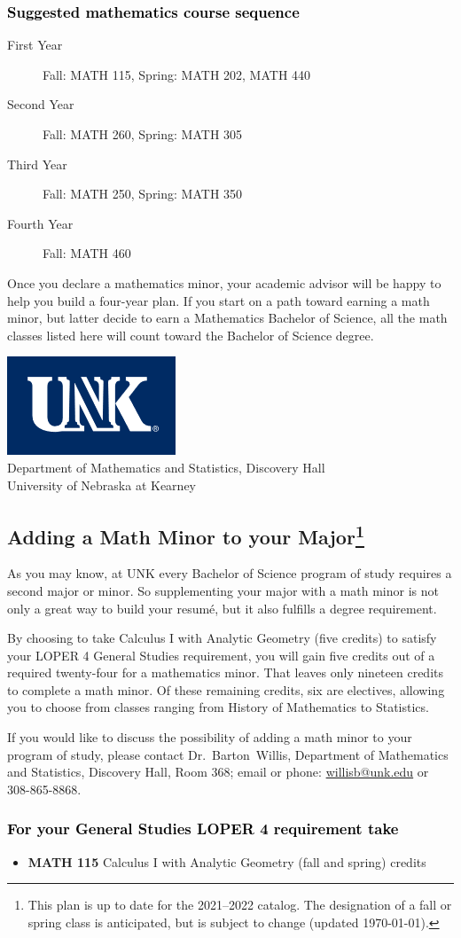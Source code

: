 \documentclass[10pt]{article}
\makeatletter
\newcommand{\calcone}{\textbf{MATH 115} Calculus I with Analytic Geometry (fall and spring) \dotfill 5 credits}
\newcommand{\contactbw}{\mbox{Dr.\ Barton Willis}, Department of Mathematics and Statistics,  Discovery Hall, Room 368;
email or phone: \href{mailto:willisb@unk.edu}{willisb@unk.edu} or 308-865-8868.}
\newcommand{\forinfo}[2]{If you would like to discuss the possibility of adding a math {#1} to your {#2}, please contact \contactbw}
\newcommand{\catalog}{2021--2022 }
\newcommand{\myfootnote}{\footnote{This plan is up to date for  the \catalog catalog. The designation of a fall or spring class is 
anticipated, but  is subject to change (updated  \today).}}
\newcommand{\myheading}{
\begin{flushleft}
\includegraphics[scale=0.35]{unk-logo}\\
\setcounter{footnote}{0}
\vspace{0.25in}
 \textcolor{unkblue}{Department of Mathematics and Statistics, Discovery Hall} \\
  \textcolor{unkblue}{University of Nebraska at Kearney}
\end{flushleft}}
\makeatother
\begin{document}
\subsubsection*{\textcolor{black}{Suggested mathematics course sequence}}

\begin{description}
   \item[\phantom{xxx} First Year] Fall: MATH 115, Spring:  MATH 202, MATH 440
      \item[\phantom{xxx} Second Year]  Fall: MATH 260,  Spring: MATH 305
     \item[\phantom{xxx} Third Year]  Fall: MATH 250,  Spring: MATH 350
     \item[\phantom{xxx} Fourth Year]  Fall: MATH 460
 \end{description}
  \vspace{0.1in}
  

 \noindent Once you declare a mathematics minor, your academic advisor will be happy to help you build a four-year plan. If you start on a path toward earning a math minor, but latter decide to earn a  Mathematics Bachelor of Science, all the math classes listed here will count toward the Bachelor of Science degree.




\newpage

\myheading

\subsection*{\textbf{\textcolor{unkblue}{Adding a Math Minor to your Major\myfootnote}}}

As you may know, at UNK every Bachelor of Science program of study requires a second
major or minor. So supplementing your major with a math minor is not only a great
way to build your resum\'e, but it also fulfills a degree requirement.

By choosing to take Calculus I with Analytic Geometry (five credits) to satisfy
your LOPER 4 General Studies requirement, you will gain five credits out of a
required twenty-four for a mathematics minor. That leaves only nineteen credits
to complete a math minor.  Of these remaining credits, six are electives, allowing
you to choose from classes ranging from History of Mathematics to Statistics.


\forinfo{minor}{program of study}


\subsubsection*{\textcolor{black}{For your General Studies LOPER 4 requirement take}}
\begin{itemize}
\item \calcone
\end{itemize}
\end{document}
